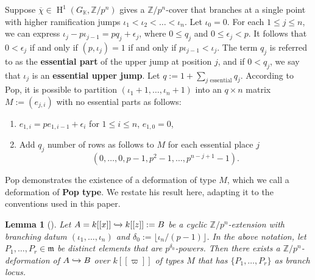 \documentclass{compositio}
\newtheorem{lemma}[theorem]{Lemma}
\theoremstyle{remark}
\theoremstyle{remark}
\DeclareMathOperator{\cohom}{H}
\begin{document}
Suppose $\overline{\chi} \in \cohom^1(G_\mathbb{K}, \mathbb{Z}/p^n)$ gives a $\mathbb{Z}/p^n$-cover that branches at a single point with higher ramification jumps $\iota_1<\iota_2<\ldots<\iota_n$. Let $\iota_0=0$. For each $1 \le j \le n$, we can express $\iota_j -p\iota_{j-1}=pq_j+\epsilon_j$, where $0 \le q_j$ and $0 \le \epsilon_j <p$. It follows that $0< \epsilon_j$ if and only if $(p, \iota_j)=1$ if and only if $p \iota_{j-1}<\iota_j$. The term $q_j$ is referred to as the \textbf{essential part} of the upper jump at position $j$, and if $0<q_j$, we say that $\iota_j$ is an \textbf{essential upper jump}. Let $q:=1+\sum_{j \text{ essential}} q_j$. According to Pop, it is possible to partition $(\iota_1+1, \ldots, \iota_{n}+1)$ into an $q \times n$ matrix $M:=(e_{j,i})$ with no essential parts as follows:
\begin{enumerate}
    \item $e_{1,i}=pe_{1,i-1}+\epsilon_i$ for $1 \le i \le n$, $e_{1,0}=0$,
    \item Add $q_j$ number of rows as follows to $M$ for each essential place $j$
    \begin{equation}
    \label{eqnrowqj}
        (0, \ldots, 0, p-1, p^2-1, \ldots, p^{n-j+1}-1).
    \end{equation}
\end{enumerate}
Pop demonstrates the existence of a deformation of type $M$, which we call a deformation of \textbf{Pop type}. We restate his result here, adapting it to the conventions used in this paper.

\begin{lemma}[{\cite[Key Lemma 3.2]{MR3194816}}]
\label{lemmapopdeformation}
Let $A=k[[x]] \xhookrightarrow{} k[[z]]:=B $ be a cyclic $\mathbb{Z}/p^n$-extension with branching datum $(\iota_1, \ldots, \iota_n)$ and $\delta_0:=\lfloor \iota_n/(p-1) \rfloor$. In the above notation, let $P_1, \ldots, P_r \in \mathfrak{m}$ be distinct elements that are $p^{\delta_0}$-powers. Then there exists a $\mathbb{Z}/p^n$-deformation of $A \xhookrightarrow{} B$ over $k[[\varpi]]$ of types $M$ that has $\{P_1, \ldots, P_r\}$ as branch locus.
\end{lemma}
\end{document}
